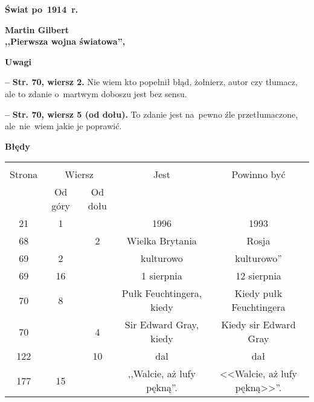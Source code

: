 \documentclass[a4paper,11pt]{article}  %
\newcommand{\spaceTwo}{2em}
\newcommand{\spaceThree}{1em}
\newcommand{\spaceFour}{0.5em}
\newcommand{\tb}{\textbf}
\newcommand{\noi}{\noindent}
\newcommand{\start}{\noi \tb{--} {}}
\newcommand{\StrWg}[2]{\tb{Str. #1, wiersz #2.}}
\newcommand{\StrWd}[2]{\tb{Str. #1, wiersz #2 (od dołu).}}
\newcommand{\Center}[1]{\begin{center} #1 \end{center}}
\newcommand{\CenterTB}[1]{\Center{\tb{#1}}}
\newcommand{\Field}[1]{ \begin{center} {\Large \tb{#1} } \end{center} }
\newcommand{\Work}[1]{ \begin{center} {\large \tb{#1}} \end{center} }
\begin{document}
\newpage
\Field{Świat po~1914~r.}

\vspace{\spaceTwo} \vspace{\spaceThree}



\Work{
  Martin Gilbert \\
  ,,Pierwsza wojna światowa'', \cite{GilbertPierwszaWojnaSwiatowa03} }


\CenterTB{Uwagi}

\start \StrWg{70}{2} Nie wiem kto popełnił błąd, żołnierz, autor czy
tłumacz, ale to zdanie o~martwym doboszu jest bez sensu.

\vspace{\spaceFour}


\start \StrWd{70}{5} To zdanie jest na~pewno źle przetłumaczone,
ale~nie~wiem jakie je poprawić.


\CenterTB{Błędy}
\begin{center}
  \begin{tabular}{|c|c|c|c|c|}
    \hline
    & \multicolumn{2}{c|}{} & & \\
    Strona & \multicolumn{2}{c|}{Wiersz}& Jest & Powinno być \\ \cline{2-3}
    & Od góry & Od dołu &  &  \\ \hline
    21  &  1 & & 1996 & 1993 \\
    68  & &  2 & Wielka Brytania & Rosja \\
    69  &  2 & & kulturowo & kulturowo'' \\
    69  & 16 & & 1 sierpnia & 12 sierpnia \\
    70  &  8 & & Pułk Feuchtingera, kiedy & Kiedy pułk Feuchtingera \\
    70  & &  4 & Sir Edward Gray, kiedy & Kiedy sir Edward Gray \\
    122 & & 10 & dal & dał \\
    177 & 15 & & ,,Walcie, aż lufy pękną''.
           & <<Walcie, aż lufy pękną>>''. \\
    \hline
  \end{tabular}
\end{center}

\vspace{\spaceTwo}
\end{document}
